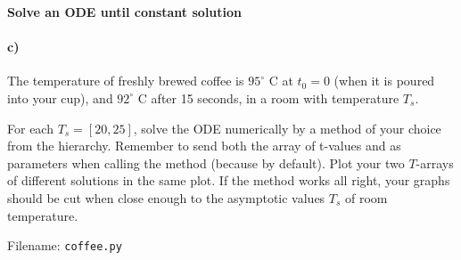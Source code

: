 \begin{Problem}{\textbf{Solve an ODE until constant solution}}
\paragraph{c)} The temperature of freshly brewed coffee is $95^{\circ}$ C at $t_0=0$ (when it is poured into your cup), and $92^{\circ}$ C after 15 seconds, in a room with temperature $T_s$.   


For each $T_s = [20, 25]$, solve the ODE numerically by a method of your choice from the  hierarchy. Remember to send both the array of t-values and  as parameters when calling the  method (because  by default). Plot your two $T$-arrays of different solutions in the same plot. If the  method works all right, your graphs should be cut when close enough to the asymptotic values $T_s$ of room temperature.

Filename: \texttt{coffee.py}
\end{Problem}
\newpage

